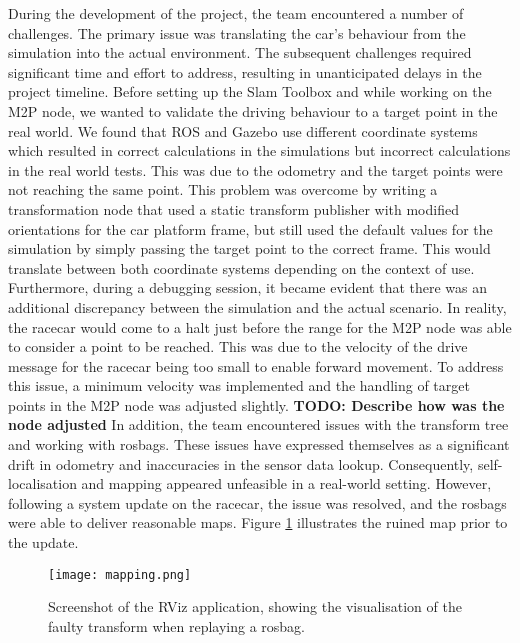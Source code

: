 During the development of the project, the team encountered a number of challenges. The primary issue was translating the car's behaviour from the simulation into the actual environment. The subsequent challenges required significant time and effort to address, resulting in unanticipated delays in the project timeline.
\newline
Before setting up the Slam Toolbox and while working on the M2P node, we wanted to validate the driving behaviour to a target point in the real world. We found that ROS and Gazebo use different coordinate systems which resulted in correct calculations in the simulations but incorrect calculations in the real world tests. This was due to the odometry and the target points were not reaching the same point. This problem was overcome by writing a transformation node that used a static transform publisher with modified orientations for the car platform frame, but still used the default values for the simulation by simply passing the target point to the correct frame. This would translate between both coordinate systems depending on the context of use.\\
Furthermore, during a debugging session, it became evident that there was an additional discrepancy between the simulation and the actual scenario. In reality, the racecar would come to a halt just before the range for the M2P node was able to consider a point to be reached. This was due to the velocity of the drive message for the racecar being too small to enable forward movement. To address this issue, a minimum velocity was implemented and the handling of target points in the M2P node was adjusted slightly. \textbf{TODO: Describe how was the node adjusted}
\newline
In addition, the team encountered issues with the transform tree and working with rosbags. These issues have expressed themselves as a significant drift in odometry and inaccuracies in the sensor data lookup. Consequently, self-localisation and mapping appeared unfeasible in a real-world setting. However, following a system update on the racecar, the issue was resolved, and the rosbags were able to deliver reasonable maps. Figure \ref{fig:map} illustrates the ruined map prior to the update.

\begin{figure}[htp]
	\vskip 0.2in
	\begin{center}
		\centerline{\texttt{[image: mapping.png]}}
		\caption{Screenshot of the RViz application, showing the visualisation of the faulty transform when replaying a rosbag.}
		\label{fig:map}
	\end{center}
	\vskip -0.2in
\end{figure}